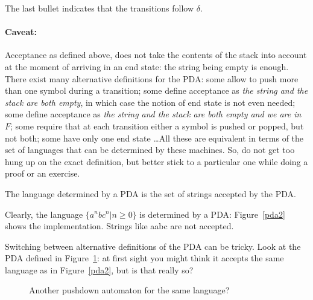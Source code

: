 The last bullet indicates that the transitions follow $\delta$.

\paragraph{Caveat:}

Acceptance as defined above, does not take the contents of the stack
into account at the moment of arriving in an end state: the string
being empty is enough. There exist many alternative definitions for
the PDA: some allow to push more than one symbol during a transition;
some define acceptance as {\em the string and the stack are both
  empty}, in which case the notion of end state is not even needed;
some define acceptance as {\em the string and the stack are both empty
  and we are in $F$}; some require that at each transition either a
symbol is pushed or popped, but not both; some have only one end state
\ldots All these are equivalent in terms of the set of languages that can
be determined by these machines. So, do not get too hung up on the
exact definition, but better stick to a particular one while doing a
proof or an exercise.


\begin{definition}
The language determined by a PDA is the set of strings accepted by the
PDA.
\end{definition}

Clearly, the language $\{a^nbc^n|n \geq 0\}$ is determined by a PDA:
Figure~\ref{pda2} shows the implementation. Strings like aabc are not
accepted.

Switching between alternative definitions of the PDA can be
tricky. Look at the PDA defined in Figure~\ref{pda1}: at first sight
you might think it accepts the same language as in Figure~\ref{pda2},
but is that really so?

\begin{figure}[h]
\caption{Another pushdown automaton for the same language?\label{pda1}}
\end{figure}

